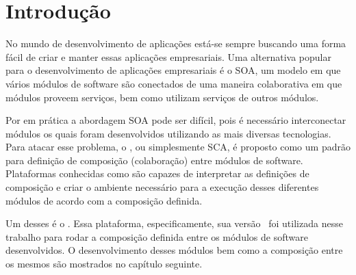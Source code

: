 %


\chapter{Introdução}

No mundo de desenvolvimento de aplicações está-se sempre buscando uma forma
fácil de criar e manter essas aplicações empresariais. Uma alternativa popular para o
desenvolvimento de aplicações empresariais é o SOA, um modelo em que vários
módulos de software são conectados de uma maneira colaborativa em que módulos
proveem serviços, bem como utilizam serviços de outros módulos.

Por em prática a abordagem SOA pode ser difícil, pois é necessário interconectar
módulos os quais foram desenvolvidos utilizando as mais diversas tecnologias.
Para atacar esse problema, o 
, ou simplesmente SCA, é proposto como um padrão para
definição de composição (colaboração) entre módulos de software. Plataformas
conhecidas como  são capazes de interpretar as
definições de composição e criar o ambiente necessário para a execução desses
diferentes módulos de acordo com a composição definida. 

Um desses  é o \ApacheTuscany. Essa plataforma,
especificamente, sua versão \ApacheTuscanyV\, foi utilizada nesse trabalho para rodar a
composição definida entre os módulos de software desenvolvidos. O
desenvolvimento desses módulos bem como a composição entre os mesmos são
mostrados no capítulo seguinte.
